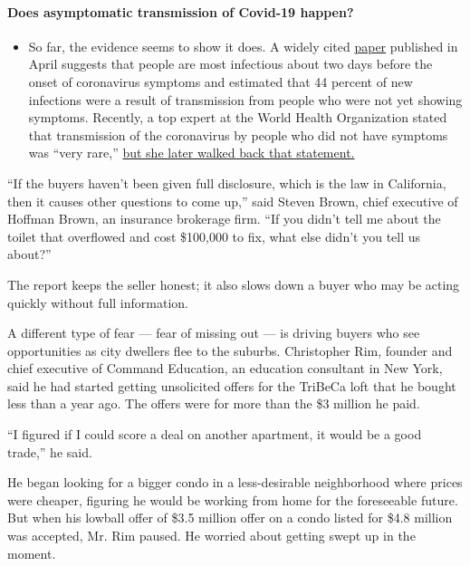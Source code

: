\begin{itemize}
{  \paragraph{Does asymptomatic transmission of Covid-19
  happen?}\label{does-asymptomatic-transmission-of-covid-19-happen}}

  \begin{itemize}
  \tightlist
  \item
    So far, the evidence seems to show it does. A widely cited
    \href{https://www.nature.com/articles/s41591-020-0869-5}{paper}
    published in April suggests that people are most infectious about
    two days before the onset of coronavirus symptoms and estimated that
    44 percent of new infections were a result of transmission from
    people who were not yet showing symptoms. Recently, a top expert at
    the World Health Organization stated that transmission of the
    coronavirus by people who did not have symptoms was ``very rare,''
    \href{https://www.nytimes3xbfgragh.onion/2020/06/09/world/coronavirus-updates.html?action=click\&pgtype=Article\&state=default\&region=MAIN_CONTENT_3\&context=storylines_faq\#link-1f302e21}{but
    she later walked back that statement.}
  \end{itemize}
\end{itemize}

``If the buyers haven't been given full disclosure, which is the law in
California, then it causes other questions to come up,'' said Steven
Brown, chief executive of Hoffman Brown, an insurance brokerage firm.
``If you didn't tell me about the toilet that overflowed and cost
\$100,000 to fix, what else didn't you tell us about?''

The report keeps the seller honest; it also slows down a buyer who may
be acting quickly without full information.

A different type of fear --- fear of missing out --- is driving buyers
who see opportunities as city dwellers flee to the suburbs. Christopher
Rim, founder and chief executive of Command Education, an education
consultant in New York, said he had started getting unsolicited offers
for the TriBeCa loft that he bought less than a year ago. The offers
were for more than the \$3 million he paid.

``I figured if I could score a deal on another apartment, it would be a
good trade,'' he said.

He began looking for a bigger condo in a less-desirable neighborhood
where prices were cheaper, figuring he would be working from home for
the foreseeable future. But when his lowball offer of \$3.5 million
offer on a condo listed for \$4.8 million was accepted, Mr. Rim paused.
He worried about getting swept up in the moment.

